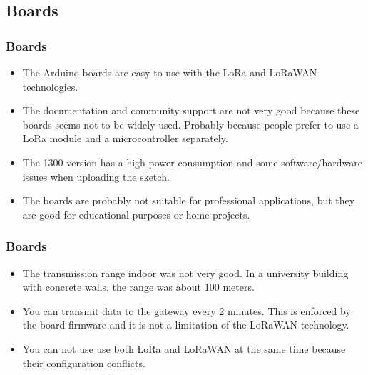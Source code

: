 \documentclass{beamer}
\begin{document}
\subsection{Boards}
\begin{frame}
    \frametitle{Boards}
    \begin{itemize}[<+->]
        \item The Arduino boards are easy to use with the LoRa and LoRaWAN technologies.
        \item The documentation and community support are not very good because these boards
              seems not to be widely used. Probably because people prefer to use a LoRa
              module and a microcontroller separately.
        \item The 1300 version has a high power consumption and some software/hardware issues
              when uploading the sketch.
        \item The boards are probably not suitable for professional applications, but they
              are good for educational purposes or home projects.
    \end{itemize}
\end{frame}

\begin{frame}
    \frametitle{Boards}
    \begin{itemize}[<+->]
        \item The transmission range indoor was not very good. In a university building with
              concrete walls, the range was about 100 meters.
        \item You can transmit data to the gateway every 2 minutes. This is enforced by the
              board firmware and it is not a limitation of the LoRaWAN technology.
        \item You can not use use both LoRa and LoRaWAN at the same time because their
              configuration conflicts.
    \end{itemize}
\end{frame}
\end{document}
